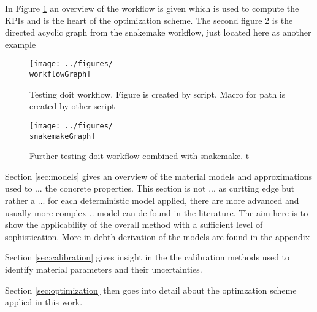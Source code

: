 In Figure \ref{fig:workflow} an overview of the workflow is given which is used to compute the KPIs and is the heart of the optimization scheme.
The second figure \ref{fig:snakemake_workflow} is the directed acyclic graph from the snakemake workflow, just located here as another example
\begin{figure}[h]%
	\centering
	\texttt{[image: ../figures/\\workflowGraph]}
	\caption{Testing doit workflow. Figure is created by script. Macro for path is created by other script}\label{fig:workflow}
\end{figure}
\begin{figure}[h]%
\centering
\texttt{[image: ../figures/\\snakemakeGraph]}
\caption{Further testing doit workflow combined with snakemake. t}\label{fig:snakemake_workflow}
\end{figure}

Section \ref{sec:models} gives an overview of the material models and approximations used to ... the concrete properties.
This section is not ... as curtting edge but rather a ... 
for each deterministic model applied, there are more advanced and usually more complex .. model can de found in the literature.
The aim here is to show the applicability of the overall method with a sufficient level of sophistication.
More in debth derivation of the models are found in the appendix

Section \ref{sec:calibration} gives insight in the the calibration methods used to identify material parameters and their uncertainties.

Section \ref{sec:optimization} then goes into detail about the optimzation scheme applied in this work.

